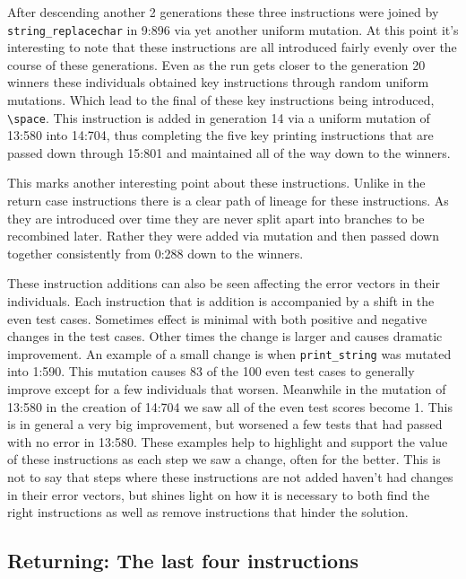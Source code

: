 After descending another 2 generations these three instructions were joined by \texttt{string\_replacechar}
in 9:896 via yet another uniform mutation. At this point it's interesting to note that these instructions are
all introduced fairly evenly over the course of these generations. Even as the run gets closer to the generation
20 winners these individuals obtained key instructions through random uniform mutations. Which lead to
the final of these key instructions being introduced, \texttt{\textbackslash space}.
This instruction is added in generation 14 via a uniform mutation of 13:580 into 14:704, thus completing the five key printing
instructions that are passed down through 15:801 and maintained all of the way down to the winners.

This marks another interesting point about these instructions. Unlike in the return case instructions there is a clear path of lineage for these instructions. As they are introduced over time they 
are never split apart into branches to be recombined later. Rather they were added via mutation and 
then passed down together consistently from 0:288 down to the winners.

These instruction additions can also be seen affecting the error vectors in their individuals. Each instruction that is addition
is accompanied by a shift in the even test cases. Sometimes effect is minimal with both positive and negative changes
in the test cases. Other times the change is larger and causes dramatic improvement. An example of a small change is when
\texttt{print\_string} was mutated into 1:590. This mutation causes 83 of the 100 even test cases to generally improve except for a few individuals that worsen.
Meanwhile in the mutation of 13:580  in the creation of 14:704 we saw all of the even test scores become 1. This is in general a very
big improvement, but worsened a few tests that had passed with no error in 13:580. These examples help to highlight
and support the value of these instructions as each step we saw a change, often for the better. This is not to
say that steps where these instructions are not added haven't had changes in their error vectors, but shines light
on how it is necessary to both find the right instructions as well as remove instructions that hinder the solution.

\subsection{Returning: The last four instructions}
\label{sec:Returning}

